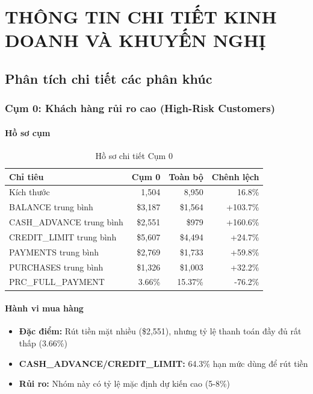 \chapter{THÔNG TIN CHI TIẾT KINH DOANH VÀ KHUYẾN NGHỊ}

\section{Phân tích chi tiết các phân khúc}

\subsection{Cụm 0: Khách hàng rủi ro cao (High-Risk Customers)}

\subsubsection{Hồ sơ cụm}

\begin{table}[H]
\centering
\caption{Hồ sơ chi tiết Cụm 0}
\begin{tabular}{|l|r|r|r|}
\hline
\textbf{Chỉ tiêu} & \textbf{Cụm 0} & \textbf{Toàn bộ} & \textbf{Chênh lệch} \\
\hline
Kích thước & 1,504 & 8,950 & 16.8\% \\
\hline
BALANCE trung bình & \$3,187 & \$1,564 & +103.7\% \\
\hline
CASH\_ADVANCE trung bình & \$2,551 & \$979 & +160.6\% \\
\hline
CREDIT\_LIMIT trung bình & \$5,607 & \$4,494 & +24.7\% \\
\hline
PAYMENTS trung bình & \$2,769 & \$1,733 & +59.8\% \\
\hline
PURCHASES trung bình & \$1,326 & \$1,003 & +32.2\% \\
\hline
PRC\_FULL\_PAYMENT & 3.66\% & 15.37\% & -76.2\% \\
\hline
\end{tabular}
\end{table}

\subsubsection{Hành vi mua hàng}

\begin{itemize}
    \item \textbf{Đặc điểm:} Rút tiền mặt nhiều (\$2,551), nhưng tỷ lệ thanh toán đầy đủ rất thấp (3.66\%)
    \item \textbf{CASH\_ADVANCE/CREDIT\_LIMIT:} 64.3\% hạn mức dùng để rút tiền
    \item \textbf{Rủi ro:} Nhóm này có tỷ lệ mặc định dự kiến cao (5-8\%)
\end{itemize}


